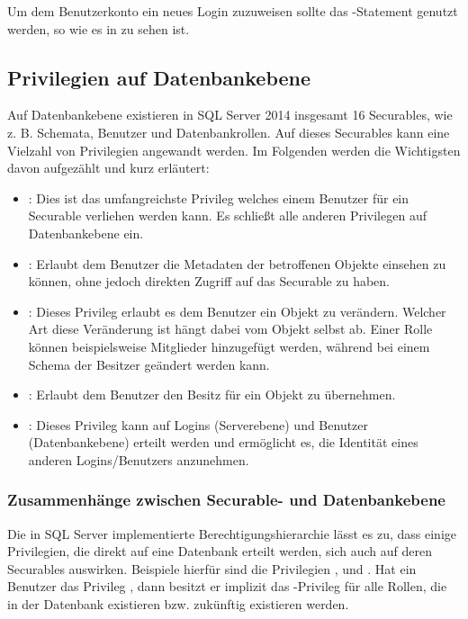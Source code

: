           Um dem Benutzerkonto  ein neues Login
          zuzuweisen sollte das -Statement genutzt
          werden, so wie es in  zu sehen ist.
          \begin{literaturinternet}
            \item \cite{ms175475}
            \item \cite{ms174378}
          \end{literaturinternet}            
      \subsection{Privilegien auf Datenbankebene}
        Auf Datenbankebene existieren in SQL Server 2014 insgesamt 16
        Securables, wie z. B. Schemata, Benutzer und Datenbankrollen. Auf dieses
        Securables kann eine Vielzahl von Privilegien angewandt werden. Im
        Folgenden werden die Wichtigsten davon aufgezählt und kurz erläutert:
        \begin{itemize}
          \item {}: Dies ist das umfangreichste Privileg
          welches einem Benutzer für ein Securable verliehen werden kann. Es
          schließt alle anderen Privilegen auf Datenbankebene ein.
          \item {}: Erlaubt dem Benutzer die Metadaten
          der betroffenen Objekte einsehen zu können, ohne jedoch direkten
          Zugriff auf das Securable zu haben.
          \item {}: Dieses Privileg erlaubt es dem Benutzer ein
          Objekt zu verändern. Welcher Art diese Veränderung ist hängt dabei
          vom Objekt selbst ab. Einer Rolle können beispielsweise Mitglieder
          hinzugefügt werden, während bei einem Schema der Besitzer geändert
          werden kann.
          \item {}: Erlaubt dem Benutzer den Besitz für
          ein Objekt zu übernehmen.
          \item {}: Dieses Privileg kann auf Logins
          (Serverebene) und Benutzer (Datenbankebene) erteilt werden und
          ermöglicht es, die Identität eines anderen Logins/Benutzers
          anzunehmen.
        \end{itemize}
        \subsubsection{Zusammenhänge zwischen Securable- und Datenbankebene}
          Die in SQL Server implementierte Berechtigungshierarchie lässt es zu,
          dass einige Privilegien, die direkt auf eine Datenbank erteilt werden,
          sich auch auf deren Securables auswirken. Beispiele hierfür sind die
          Privilegien ,  und
          . Hat ein Benutzer das Privileg
          , dann besitzt er implizit das
          -Privileg für alle Rollen, die in der Datenbank
          existieren bzw. zukünftig existieren werden.
          
